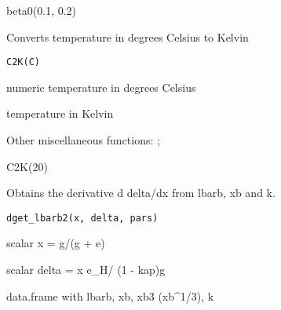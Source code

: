 \documentclass[a4paper]{book}
\begin{document}
%
\begin{Examples}
\begin{ExampleCode}
beta0(0.1, 0.2)
\end{ExampleCode}
\end{Examples}
%
\begin{Description}\relax
Converts temperature in degrees Celsius to Kelvin
\end{Description}
%
\begin{Usage}
\begin{verbatim}
C2K(C)
\end{verbatim}
\end{Usage}
%
\begin{Arguments}
\begin{ldescription}
\item[\code{C}] numeric temperature in degrees Celsius
\end{ldescription}
\end{Arguments}
%
\begin{Value}
temperature in Kelvin
\end{Value}
%
\begin{SeeAlso}\relax
Other miscellaneous functions: ;
\end{SeeAlso}
%
\begin{Examples}
\begin{ExampleCode}
C2K(20)
\end{ExampleCode}
\end{Examples}
%
\begin{Description}\relax
Obtains the derivative d delta/dx from lbarb, xb and k.
\end{Description}
%
\begin{Usage}
\begin{verbatim}
dget_lbarb2(x, delta, pars)
\end{verbatim}
\end{Usage}
%
\begin{Arguments}
\begin{ldescription}
\item[\code{x}] scalar x = g/(g + e)

\item[\code{delta}] scalar delta = x e\_H/ (1 - kap)g

\item[\code{pars}] data.frame with lbarb, xb, xb3 (xb\textasciicircum{}1/3), k
\end{ldescription}
\end{Arguments}
\end{document}
